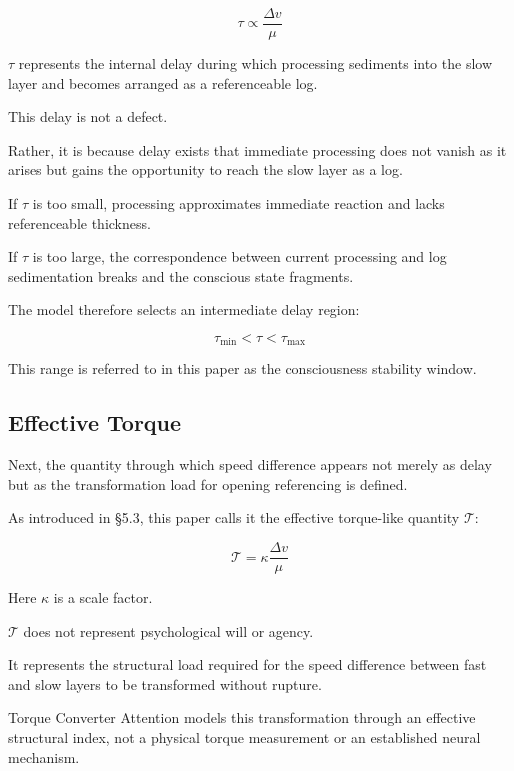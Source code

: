 \begin{equation}
\tau \propto \frac{\Delta v}{\mu}
\end{equation}

$\tau$ represents the internal delay during which processing sediments into the slow layer and becomes arranged as a referenceable log.

This delay is not a defect.

Rather, it is because delay exists that immediate processing does not vanish as it arises but gains the opportunity to reach the slow layer as a log.

If $\tau$ is too small, processing approximates immediate reaction and lacks referenceable thickness.

If $\tau$ is too large, the correspondence between current processing and log sedimentation breaks and the conscious state fragments.

The model therefore selects an intermediate delay region:

\begin{equation}
\tau_{\min} < \tau < \tau_{\max}
\end{equation}

This range is referred to in this paper as the consciousness stability window.

\subsection{Effective Torque}


Next, the quantity through which speed difference appears not merely as delay but as the transformation load for opening referencing is defined.

As introduced in §5.3, this paper calls it the effective torque-like quantity $\mathcal{T}$:

\begin{equation}
\mathcal{T} = \kappa \frac{\Delta v}{\mu}
\end{equation}

Here $\kappa$ is a scale factor.

$\mathcal{T}$ does not represent psychological will or agency.

It represents the structural load required for the speed difference between fast and slow layers to be transformed without rupture.

Torque Converter Attention models this transformation through an effective structural index, not a physical torque measurement or an established neural mechanism.

